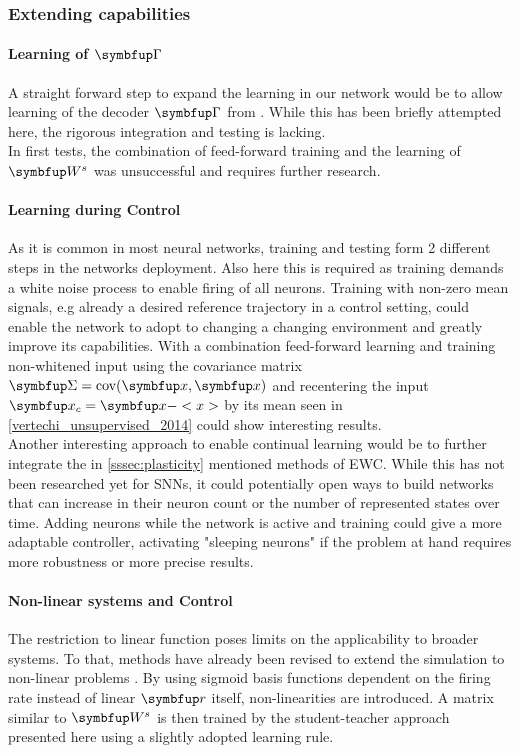 \subsubsection{Extending capabilities}
\paragraph{Learning of $\bmu{\Gamma}$}
A straight forward step to expand the learning in our network would be to allow learning of the decoder $\bmu{\Gamma}$ from \cite{brendel_learning_2020}. While this has been briefly attempted here, the rigorous integration and testing is lacking.\\
In first tests, the combination of feed-forward training and the learning of $\bmu{W}^s$ was unsuccessful and requires further research.
\paragraph{Learning during Control}
As it is common in most neural networks, training and testing form 2 different steps in the networks deployment. Also here this is required as training demands a white noise process to enable firing of all neurons. Training with non-zero mean signals, e.g already a desired reference trajectory in a control setting, could enable the network to adopt to changing a changing environment and greatly improve its capabilities. With a combination feed-forward learning and training non-whitened input using the covariance matrix $\bmu{\Sigma} = \text{cov}(\bmu{x},\bmu{x})$ and recentering the input $\bmu{x
}_c = \bmu{x} - <x>$ by its mean seen in \cref{vertechi_unsupervised_2014} could show interesting results.\\
Another interesting approach to enable continual learning would be to further integrate the in \cref{sssec:plasticity} mentioned methods of \ac{EWC}. While this has not been researched yet for \acp{SNN}, it could potentially open ways to build networks that can increase in their neuron count or the number of represented states over time. Adding neurons while the network is active and training could give a more adaptable controller, activating "sleeping neurons" if the problem at hand requires more robustness or more precise results.\\

\paragraph{Non-linear systems and Control}
The restriction to linear function poses limits on the applicability to broader systems. To that, methods have already been revised to extend the simulation to non-linear problems \cite{alemi_learning_2017}. By using sigmoid basis functions dependent on the firing rate instead of linear $\bmu{r}$ itself, non-linearities are introduced. A matrix similar to $\bmu{W}^s$ is then trained by the student-teacher approach presented here using a slightly adopted learning rule.

